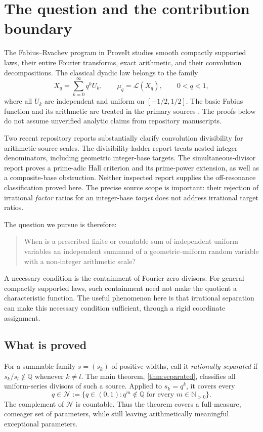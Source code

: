 \documentclass[11pt,letterpaper]{article}
\theoremstyle{definition}
\theoremstyle{remark}
\newcommand{\Np}{\mathbb N_{>0}}
\newcommand{\Q}{\mathbb Q}
\newcommand{\Law}{\mathcal L}
\newcommand{\NR}{\mathcal N}
\numberwithin{equation}{section}
\begin{document}
\section{The question and the contribution boundary}\label{sec:intro}
The Fabius--Rvachev program in ProveIt studies smooth compactly supported laws, their entire Fourier transforms, exact arithmetic, and their convolution decompositions. The classical dyadic law belongs to the family
\begin{equation}\label{eq:source}
 X_q=\sum_{k=0}^{\infty}q^kU_k,\qquad
 \mu_q=\Law(X_q),\qquad 0<q<1,
\end{equation}
where all $U_k$ are independent and uniform on $[-1/2,1/2]$. The basic Fabius function and its arithmetic are treated in the primary sources \cite{arias-definition,arias-arithmetic}. The proofs below do not assume unverified analytic claims from repository manuscripts.

Two recent repository reports substantially clarify convolution divisibility for arithmetic source scales. The divisibility-ladder report \cite{repo-ladders} treats nested integer denominators, including geometric integer-base targets. The simultaneous-divisor report \cite{repo-hall} proves a prime-adic Hall criterion and its prime-power extension, as well as a composite-base obstruction. Neither inspected report supplies the off-resonance classification proved here. The precise source scope is important: their rejection of irrational \emph{factor} ratios for an integer-base \emph{target} does not address irrational target ratios.

The question we pursue is therefore:
\begin{quote}
When is a prescribed finite or countable sum of independent uniform variables an independent summand of a geometric-uniform random variable with a non-integer arithmetic scale?
\end{quote}
A necessary condition is the containment of Fourier zero divisors. For general compactly supported laws, such containment need not make the quotient a characteristic function. The useful phenomenon here is that irrational separation can make this necessary condition sufficient, through a rigid coordinate assignment.

\subsection{What is proved}
For a summable family $s=(s_k)$ of positive widths, call it \emph{rationally separated} if $s_k/s_l\notin\Q$ whenever $k\ne l$. The main theorem, \cref{thm:separated}, classifies all uniform-series divisors of such a source. Applied to $s_k=q^k$, it covers every
\begin{equation}\label{eq:NR}
 q\in\NR:=\{q\in(0,1):q^m\notin\Q\text{ for every }m\in\Np\}.
\end{equation}
The complement of $\NR$ is countable. Thus the theorem covers a full-measure, comeager set of parameters, while still leaving arithmetically meaningful exceptional parameters.
\end{document}
